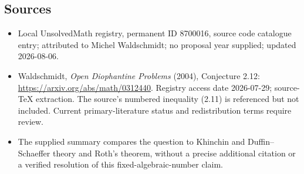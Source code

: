 \documentclass[11pt]{article}
\begin{document}
\subsection{Sources}
\begin{itemize}
\item Local UnsolvedMath registry, permanent ID 8700016, source code catalogue entry; attributed to Michel Waldschmidt; no proposal year supplied; updated 2026-08-06.
\item Waldschmidt, \emph{Open Diophantine Problems} (2004), Conjecture 2.12: \url{https://arxiv.org/abs/math/0312440}. Registry access date 2026-07-29; source-TeX extraction. The source's numbered inequality (2.11) is referenced but not included. Current primary-literature status and redistribution terms require review.
\item The supplied summary compares the question to Khinchin and Duffin--Schaeffer theory and Roth's theorem, without a precise additional citation or a verified resolution of this fixed-algebraic-number claim.
\end{itemize}
\end{document}
